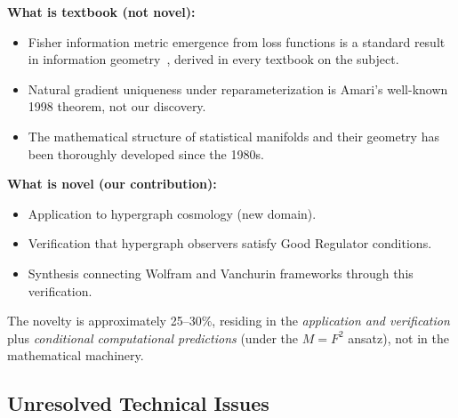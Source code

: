 \documentclass[11pt,a4paper]{article}
\theoremstyle{plain}
\theoremstyle{definition}
\theoremstyle{remark}
\begin{document}
\textbf{What is textbook (not novel):}
\begin{itemize}[noitemsep]
\item Fisher information metric emergence from loss functions is a standard result in information geometry~\cite{amari1998natural}, derived in every textbook on the subject.
\item Natural gradient uniqueness under reparameterization is Amari's well-known 1998 theorem, not our discovery.
\item The mathematical structure of statistical manifolds and their geometry has been thoroughly developed since the 1980s.
\end{itemize}

\textbf{What is novel (our contribution):}
\begin{itemize}[noitemsep]
\item Application to hypergraph cosmology (new domain).
\item Verification that hypergraph observers satisfy Good Regulator conditions.
\item Synthesis connecting Wolfram and Vanchurin frameworks through this verification.
\end{itemize}

The novelty is approximately 25--30\%, residing in the \emph{application and verification} plus \emph{conditional computational predictions} (under the $M = F^2$ ansatz), not in the mathematical machinery.

\subsection{Unresolved Technical Issues}
\end{document}
